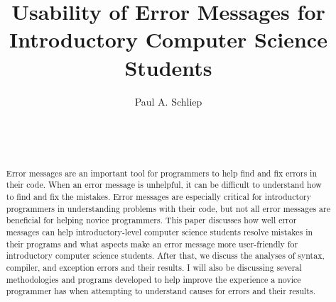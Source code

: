 \documentclass{sig-alternate}
\begin{document}

\title{Usability of Error Messages for Introductory Computer Science Students}


\author{
\alignauthor
Paul A. Schliep\\
	\\
	\\
	\\
}

\maketitle
\begin{abstract}
Error messages are an important tool for programmers to help find and fix errors in their code. When an error message is unhelpful, it can be difficult to understand how to find and fix the mistakes. Error messages are especially critical for introductory programmers in understanding problems with their code, but not all error messages are beneficial for helping novice programmers. This paper discusses how well error messages can help introductory-level computer science students resolve mistakes in their programs and what aspects make an error message more user-friendly for introductory computer science students. After that, we discuss the analyses of syntax, compiler, and exception errors and their results. I will also be discussing several methodologies and programs developed to help improve the experience a novice programmer has when attempting to understand causes for errors and their results.

\end{abstract}
\end{document}
